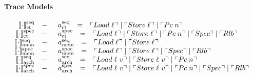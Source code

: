 \documentclass[12pt]{article}
\newcommand{\ccseqct}{\ensuremath\llbracket\cdot\rrbracket^{\text{seq}}_{\text{ct}}}
\newcommand{\ccseqmem}{\ensuremath\llbracket\cdot\rrbracket^{\text{seq}}_{\text{mem}}}
\newcommand{\ccspecmem}{\ensuremath\llbracket\cdot\rrbracket^{\text{spec}}_{\text{mem}}}
\newcommand{\ccspecct}{\ensuremath\llbracket\cdot\rrbracket^{\text{spec}}_{\text{ct}}}
\newcommand{\ccseqarch}{\ensuremath\llbracket\cdot\rrbracket^{\text{seq}}_{\text{arch}}}
\newcommand{\ccspecarch}{\ensuremath\llbracket\cdot\rrbracket^{\text{spec}}_{\text{arch}}}
\begin{document}
\paragraph{Trace Models}

\[
  \begin{array}{rcl}
  \ccseqct &-&
    \begin{array}{rcl}
      \seqctEvent & = & \ev{Load\;\varLoc} \mid %
                        \ev{Store\;\varLoc} \mid %
                        \ev{Pc\;n}
    \end{array} \\
  \ccspecct &-&
    \begin{array}{rcl}
      \specctEvent & = & \ev{Load\;\varLoc} \mid %
                         \ev{Store\;\varLoc} \mid %
                         \ev{Pc\;n} \mid %
                         \ev{Spec} \mid %
                         \ev{Rlb} 
    \end{array} \\
  \ccseqmem &-&
    \begin{array}{rcl}
      \seqmemEvent & = & \ev{Load\;\varLoc} \mid %
                         \ev{Store\;\varLoc}
    \end{array} \\
  \ccspecmem &-&
    \begin{array}{rcl}
      \specmemEvent & = & \ev{Load\;\varLoc} \mid %
                          \ev{Store\;\varLoc} \mid %
                          \ev{Spec} \mid %
                          \ev{Rlb} 
    \end{array} \\
  \ccseqarch &-&
    \begin{array}{rcl}
      \seqarchEvent & = & \ev{Load\;\varLoc\;v} \mid %
                          \ev{Store\;\varLoc\;v} \mid %
                          \ev{Pc\;n}
    \end{array} \\
  \ccspecarch &-&
    \begin{array}{rcl}
      \specarchEvent & = & \ev{Load\;\varLoc\;v} \mid %
                           \ev{Store\;\varLoc\;v} \mid %
                           \ev{Pc\;n} \mid %
                           \ev{Spec} \mid %
                           \ev{Rlb} 
    \end{array} \\
  \end{array}
\]

\begin{center}
\end{center}
\end{document}
